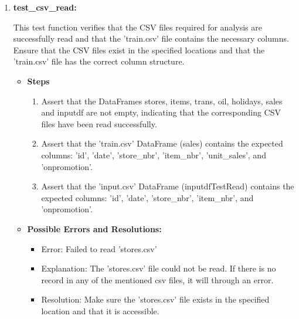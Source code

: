 		\begin{enumerate}
			
			\item \textbf{test\_csv\_read:}
			
			This test function verifies that the CSV files required for analysis are successfully read and that the 'train.csv' file contains the necessary columns. Ensure that the CSV files exist in the specified locations and that the 'train.csv' file has the correct column structure.
			
			\begin{itemize}
				
				\item \textbf{Steps}
				
					\begin{enumerate}
						
						\item Assert that the DataFrames stores, items, trans, oil, holidays, sales and inputdf are not empty, indicating that the corresponding CSV files have been read successfully.
				
						\item Assert that the 'train.csv' DataFrame (sales) contains the expected columns: 'id', 'date', 'store\_nbr', 'item\_nbr', 'unit\_sales', and 'onpromotion'.
						
						\item Assert that the 'input.csv' DataFrame (inputdfTestRead) contains the expected columns: 'id', 'date', 'store\_nbr', 'item\_nbr', and 'onpromotion'.
						
			\end{enumerate}
				
				\item \textbf{Possible Errors and Resolutions:}
				
				\begin{itemize}
					
					\item Error: Failed to read 'stores.csv'
					
					\item Explanation: The 'stores.csv' file could not be read. If there is no record in any of the mentioned csv files, it will through an error.
					
					\item Resolution: Make sure the 'stores.csv' file exists in the specified location and that it is accessible.
					
				\end{itemize}
				

\end{itemize}
\end{enumerate}
